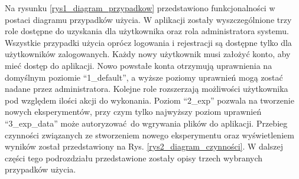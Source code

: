 Na rysunku \ref{rys1_diagram_przypadkow} przedstawiono funkcjonalności w postaci diagramu przypadków użycia. W aplikacji zostały wyszczególnione trzy role dostępne do uzyskania dla użytkownika oraz rola administratora systemu. Wszystkie przypadki użycia oprócz logowania i rejestracji są dostępne tylko dla użytkowników zalogowanych. Każdy nowy użytkownik musi założyć konto, aby mieć dostęp do aplikacji. Nowo powstałe konta otrzymują uprawnienia na domyślnym poziomie \enquote{1\_default}, a wyższe poziomy uprawnień mogą zostać nadane przez administratora. Kolejne role rozszerzają możliwości użytkownika pod względem ilości akcji do wykonania. Poziom \enquote{2\_exp} pozwala na tworzenie nowych eksperymentów, przy czym tylko najwyższy poziom uprawnień \enquote{3\_exp\_data}  może autoryzować do wgrywania plików do aplikacji. Przebieg czynności związanych ze stworzeniem nowego eksperymentu oraz wyświetleniem wyników został przedstawiony na Rys. \ref{rys2_diagram_czynności}. W dalszej części tego podrozdziału przedstawione zostały opisy trzech wybranych przypadków użycia.

